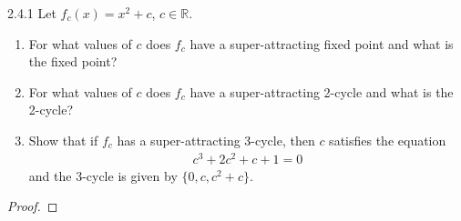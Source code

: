 \begin{problem}{2.4.1}
  Let $f_c(x) = x^2 + c$, $c\in\mathbb{R}$.
  \begin{enumerate}
    \item For what values of $c$ does $f_c$ have a super-attracting fixed point
      and what is the fixed point?
    \item For what values of $c$ does $f_c$ have a super-attracting 2-cycle
      and what is the 2-cycle?
    \item Show that if $f_c$ has a super-attracting 3-cycle, then $c$ satisfies
      the equation
      \begin{align*}
        c^3 + 2c^2 +c +1 = 0
      \end{align*}
      and the 3-cycle is given by $\{0, c, c^2 + c\}$.
  \end{enumerate}
\end{problem}

\begin{proof}
\end{proof}
\newpage
